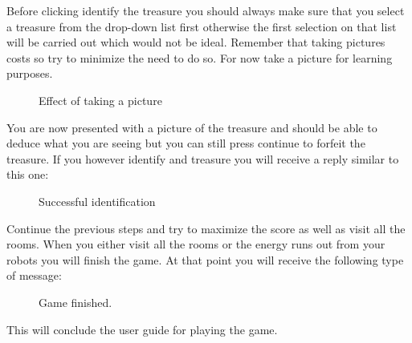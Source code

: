 	Before clicking identify the treasure you should always make sure that you select a treasure from the drop-down list first otherwise the first selection on that list will be carried out which would not be ideal. Remember that taking pictures costs so try to minimize the need to do so. For now take a picture for learning purposes.

	\begin{figure}[htp]
		\centering
		\caption{Effect of taking a picture}
	\end{figure}

	You are now presented with a picture of the treasure and should be able to deduce what you are seeing but you can still press continue to forfeit the treasure. If you however identify and treasure you will receive a reply similar to this one:

	\begin{figure}[!htp]
		\centering
		\caption{Successful identification}
	\end{figure}

	Continue the previous steps and try to maximize the score as well as visit all the rooms. When you either visit all the rooms or the energy runs out from your robots you will finish the game. At that point you will receive the following type of message:
	\begin{figure}[htp]
		\centering
		\caption{Game finished.}
	\end{figure}

	This will conclude the user guide for playing the game.

